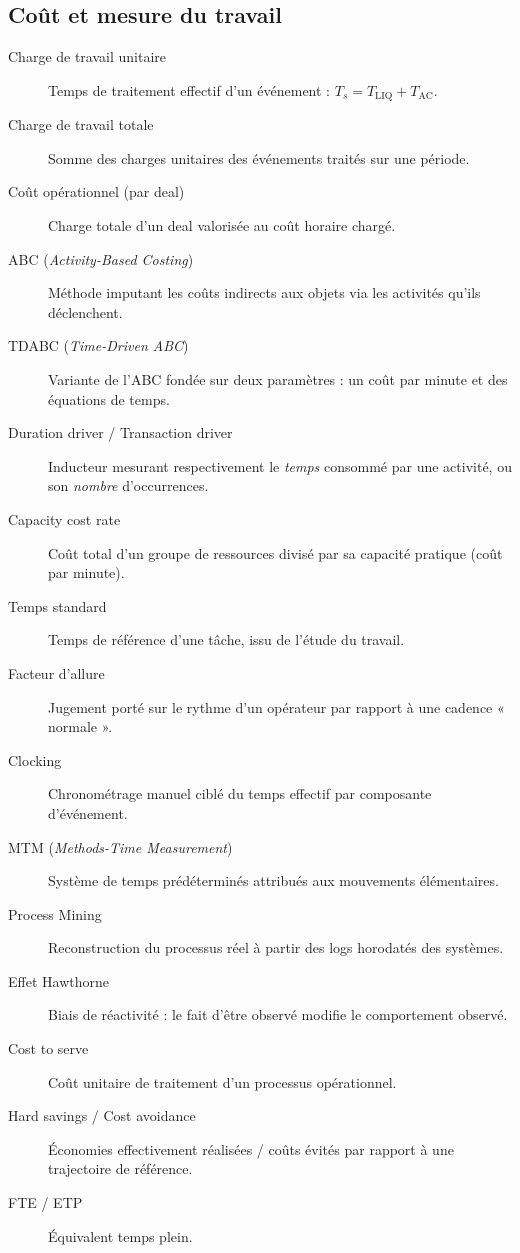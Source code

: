 \subsection*{Coût et mesure du travail}
\begin{description}
  \item[Charge de travail unitaire] Temps de traitement effectif d'un événement : $T_s = T_{\text{LIQ}} + T_{\text{AC}}$.
  \item[Charge de travail totale] Somme des charges unitaires des événements traités sur une période.
  \item[Coût opérationnel (par deal)] Charge totale d'un deal valorisée au coût horaire chargé.
  \item[ABC (\textit{Activity-Based Costing})] Méthode imputant les coûts indirects aux objets via les activités qu'ils déclenchent.
  \item[TDABC (\textit{Time-Driven ABC})] Variante de l'ABC fondée sur deux paramètres : un coût par minute et des équations de temps.
  \item[Duration driver / Transaction driver] Inducteur mesurant respectivement le \textit{temps} consommé par une activité, ou son \textit{nombre} d'occurrences.
  \item[Capacity cost rate] Coût total d'un groupe de ressources divisé par sa capacité pratique (coût par minute).
  \item[Temps standard] Temps de référence d'une tâche, issu de l'étude du travail.
  \item[Facteur d'allure] Jugement porté sur le rythme d'un opérateur par rapport à une cadence « normale ».
  \item[Clocking] Chronométrage manuel ciblé du temps effectif par composante d'événement.
  \item[MTM (\textit{Methods-Time Measurement})] Système de temps prédéterminés attribués aux mouvements élémentaires.
  \item[Process Mining] Reconstruction du processus réel à partir des logs horodatés des systèmes.
  \item[Effet Hawthorne] Biais de réactivité : le fait d'être observé modifie le comportement observé.
  \item[Cost to serve] Coût unitaire de traitement d'un processus opérationnel.
  \item[Hard savings / Cost avoidance] Économies effectivement réalisées / coûts évités par rapport à une trajectoire de référence.
  \item[FTE / ETP] Équivalent temps plein.
\end{description}

